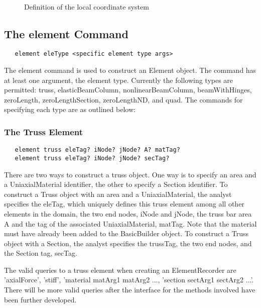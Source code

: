 \documentclass[12pt]{article}
\begin{document}
\begin{figure}[htpb]
\begin{center}
\leavevmode
\hbox{%
}
\end{center}
\caption{Definition of the local coordinate system}
\label{localAxis}
\end{figure}

\subsection{The element Command}
{\sf\small
\begin{verbatim}
   element eleType <specific element type args>
\end{verbatim}
}

The element command is used to construct an Element object. The
command has at least one argument, the element type. Currently the
following types are permitted: truss, elasticBeamColumn,
nonlinearBeamColumn, beamWithHinges, zeroLength, zeroLengthSection,
zeroLengthND, and quad. The commands for specifying each type are as
outlined below:  

\subsubsection{The Truss Element}
{\sf\small
\begin{verbatim}
   element truss eleTag? iNode? jNode? A? matTag?
   element truss eleTag? iNode? jNode? secTag?
\end{verbatim}
}

\noindent There are two ways to construct a truss object. One way is
to specify an area and a UniaxialMaterial identifier, the other to specify a
Section identifier. To construct a Truss object with an area and a
UniaxialMaterial, the analyst specifies the eleTag, which uniquely defines
this truss element among all other elements in the domain, the two end
nodes, iNode and jNode, the truss bar area A and the tag of the
associated UniaxialMaterial, matTag. Note that the material must have already
been added to the BasicBuilder object. To construct a Truss object
with a Section, the analyst specifies the trussTag, the two end nodes,
and the Section tag, secTag. 

The valid queries to a truss element when creating an ElementRecorder
are 'axialForce', 'stiff', 'material matArg1 matArg2 ..., 'section sectArg1
sectArg2 ...'. There will be more valid queries after the interface
for the methods involved have been further developed.
\end{document}
